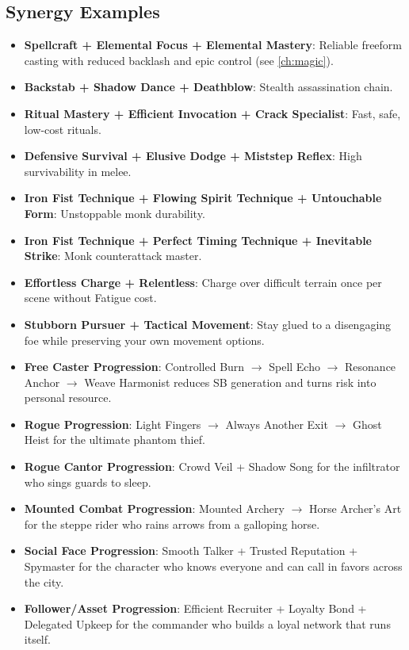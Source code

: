 \subsection*{Synergy Examples}
\label{sec:synergy-examples}
\begin{itemize}
  \item \textbf{Spellcraft + Elemental Focus + Elemental Mastery}: Reliable freeform casting with reduced backlash and epic control (see \ref{ch:magic}).
  \item \textbf{Backstab + Shadow Dance + Deathblow}: Stealth assassination chain.
  \item \textbf{Ritual Mastery + Efficient Invocation + Crack Specialist}: Fast, safe, low-cost rituals.
  \item \textbf{Defensive Survival + Elusive Dodge + Miststep Reflex}: High survivability in melee.
  \item \textbf{Iron Fist Technique + Flowing Spirit Technique + Untouchable Form}: Unstoppable monk durability.
  \item \textbf{Iron Fist Technique + Perfect Timing Technique + Inevitable Strike}: Monk counterattack master.
  \item \textbf{Effortless Charge + Relentless}: Charge over difficult terrain once per scene without Fatigue cost.
  \item \textbf{Stubborn Pursuer + Tactical Movement}: Stay glued to a disengaging foe while preserving your own movement options.
  \item \textbf{Free Caster Progression}: Controlled Burn $\rightarrow$ Spell Echo $\rightarrow$ Resonance Anchor $\rightarrow$ Weave Harmonist reduces SB generation and turns risk into personal resource.
  \item \textbf{Rogue Progression}: Light Fingers $\rightarrow$ Always Another Exit $\rightarrow$ Ghost Heist for the ultimate phantom thief.
  \item \textbf{Rogue Cantor Progression}: Crowd Veil + Shadow Song for the infiltrator who sings guards to sleep.
  \item \textbf{Mounted Combat Progression}: Mounted Archery $\rightarrow$ Horse Archer's Art for the steppe rider who rains arrows from a galloping horse.
  \item \textbf{Social Face Progression}: Smooth Talker + Trusted Reputation + Spymaster for the character who knows everyone and can call in favors across the city.
  \item \textbf{Follower/Asset Progression}: Efficient Recruiter + Loyalty Bond + Delegated Upkeep for the commander who builds a loyal network that runs itself.

\end{itemize}
